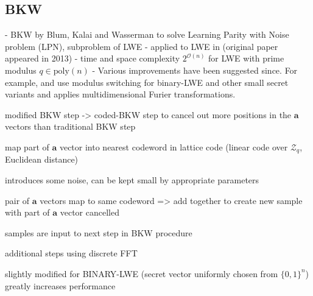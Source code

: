 \subsection{BKW \cite{BKW03}}

- BKW by Blum, Kalai and Wasserman \cite{BKW03} to solve Learning Parity with Noise problem (LPN), subproblem of LWE
- applied to LWE in \cite{ACFFP15a} (original paper appeared in 2013)
- time and space complexity $2^{\mathcal{O}(n)}$ for LWE with prime modulus $q \in \text{poly}(n)$ %
- Various improvements have been suggested since. For example, \cite{AFFP14} and \cite{KF15} use modulus switching for binary-LWE and other small secret variants \cite{AFFP14} and \cite{DTV15} applies multidimensional Furier transformations. %

modified BKW step -> coded-BKW step to cancel out more positions in the $\mathbf{a}$ vectors than traditional BKW step

map part of $\mathbf{a}$ vector into nearest codeword in lattice code (linear code over $\mathcal{Z}_q$, Euclidean distance)

introduces some noise, can be kept small by appropriate parameters

pair of $\mathbf{a}$ vectors map to same codeword => add together to create new sample with part of $\mathbf{a}$ vector cancelled

samples are input to next step in BKW procedure

additional steps using discrete FFT

slightly modified for BINARY-LWE (secret vector uniformly chosen from $\{0, 1\}^n$) greatly increases performance

